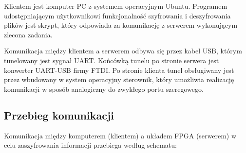 Klientem jest komputer PC z systemem operacyjnym Ubuntu. Programem udostępniającym użytkownikowi funkcjonalność szyfrowania i deszyfrowania plików jest skrypt, który odpowiada za komunikację z serwerem wykonującym zlecona zadania.

Komunikacja między klientem a serwerem odbywa się przez kabel USB, którym tunelowany jest sygnał UART. Końcówką tunelu po stronie serwera jest konwerter UART-USB firmy FTDI. Po stronie klienta tunel obsługiwany jest przez wbudowany w system operacyjny sterownik, który umożliwia realizację komunikacji w sposób analogiczny do zwykłego portu szeregowego.


\subsection{Przebieg komunikacji}
\label{sec:przebieg-komunikacji}
Komunikacja między komputerem (klientem) a układem FPGA (serwerem) w celu zaszyfrowania informacji przebiega według schematu:
